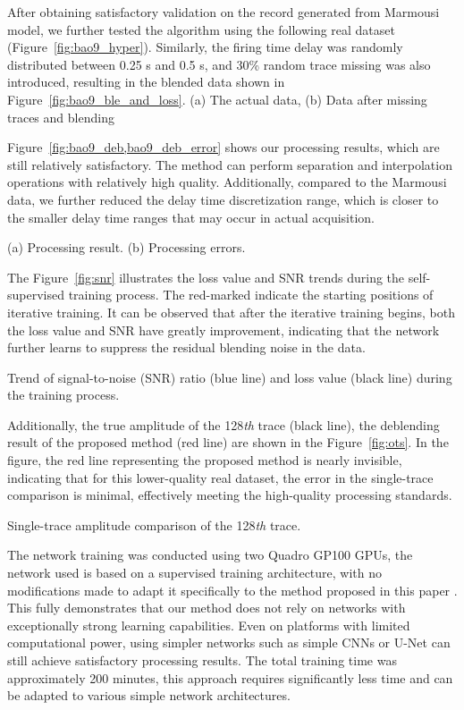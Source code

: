 \documentclass{segabs}
\begin{document}
After obtaining satisfactory validation on the record generated from Marmousi model, we further tested the algorithm using the following real dataset (Figure~\ref{fig:bao9_hyper}). Similarly, the firing time delay was randomly distributed between 0.25 s and 0.5 s, and 30\% random trace missing was also introduced, resulting in the blended data shown in Figure~\ref{fig:bao9_ble_and_loss}.
{(a) The actual data,
(b) Data after missing traces and blending}

Figure~\ref{fig:bao9_deb,bao9_deb_error} shows our processing results, which are still relatively satisfactory. The method can perform separation and interpolation operations with relatively high quality. Additionally, compared to the Marmousi data, we further reduced the delay time discretization range, which is closer to the smaller delay time ranges that may occur in actual acquisition.


{(a) Processing result.
(b) Processing errors.}

The Figure~\ref{fig:snr} illustrates the loss value and SNR trends during the self-supervised training process. The red-marked indicate the starting positions of iterative training. It can be observed that after the iterative training begins, both the loss value and SNR have greatly improvement, indicating that the network further learns to suppress the residual blending noise in the data. 

{Trend of signal-to-noise (SNR) ratio (blue line) and loss value (black line) during the training process.}

Additionally, the true amplitude of the 128\textit{th} trace (black line), the deblending result of the proposed method (red line) are shown in the Figure~\ref{fig:ots}. In the figure, the red line representing the proposed method is nearly invisible, indicating that for this lower-quality real dataset, the error in the single-trace comparison is minimal, effectively meeting the high-quality processing standards.

{Single-trace amplitude comparison of the 128\textit{th} trace.}

The network training was conducted using two Quadro GP100 GPUs, the network used is based on a supervised training architecture, with no modifications made to adapt it specifically to the method proposed in this paper \cite[]{ke2024hybrid}. This fully demonstrates that our method does not rely on networks with exceptionally strong learning capabilities. Even on platforms with limited computational power, using simpler networks such as simple CNNs or U-Net can still achieve satisfactory processing results. The total training time was approximately 200 minutes, this approach requires significantly less time and can be adapted to various simple network architectures.
\end{document}
